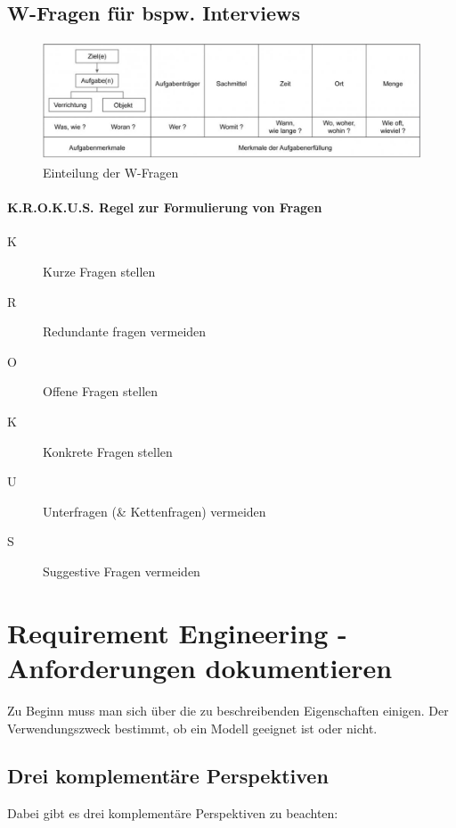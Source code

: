 \documentclass[a4paper]{article}
\begin{document}
		\subsection{W-Fragen für bspw. Interviews}
		
		\begin{figure}[!htb]
			\centering
			\includegraphics[height=3.5cm]{img/re/02/w_fragen.png}
			\caption{Einteilung der W-Fragen}
			\label{fig:re_w_fragen}
		\end{figure}
	
			\paragraph{K.R.O.K.U.S. Regel zur Formulierung von Fragen}
			
			\begin{description}
				\item[K] Kurze Fragen stellen
				\item[R] Redundante fragen vermeiden
				\item[O] Offene Fragen stellen
				\item[K] Konkrete Fragen stellen
				\item[U] Unterfragen (\& Kettenfragen) vermeiden
				\item[S] Suggestive Fragen vermeiden
			\end{description}
	
\newpage

	\section{Requirement Engineering - Anforderungen dokumentieren}
	
	Zu Beginn muss man sich über die zu beschreibenden Eigenschaften einigen.
	Der Verwendungszweck bestimmt, ob ein Modell geeignet ist oder nicht.
	
		\subsection{Drei komplementäre Perspektiven}
		
		Dabei gibt es drei komplementäre Perspektiven zu beachten:
		
\end{document}
